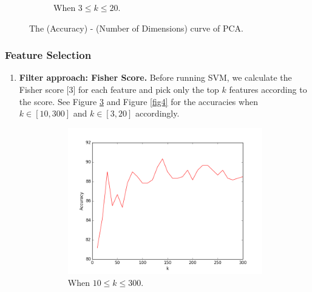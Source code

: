 \documentclass{article} %
\begin{document}
\begin{enumerate}
\begin{figure}[H]
\begin{subfigure}{.5\textwidth}
      \caption{When $3\leq k\leq 20$.}
      \label{fig2}
      \end{subfigure}
      \caption{The (Accuracy) - (Number of Dimensions) curve of PCA.}
      \label{fig1-2}
      \end{figure}
    \end{enumerate}
    
    \subsubsection{Feature Selection}
    \begin{enumerate}
          \item \textbf{Filter approach: Fisher Score.}
          Before running SVM, we calculate the Fisher score [3] for each feature and pick only the top $k$ features according to the score. See Figure \ref{fig3} and Figure \ref{fig4} for the accuracies when $k\in[10,300]$ and $k\in[3,20]$ accordingly.
          \begin{figure}[H]
          \centering
          \begin{subfigure}{.5\textwidth}
          \centering
          \includegraphics[width=\linewidth]{figure_3.png}
          \caption{When $10\leq k\leq 300$.}
          \label{fig3}
          \end{subfigure}%
          \begin{subfigure}{.5\textwidth}
          \centering

\end{subfigure}
\end{figure}
\end{enumerate}
\end{document}
